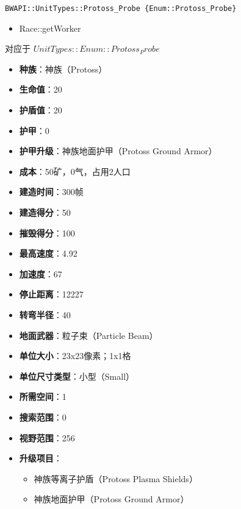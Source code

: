 \begin{tcolorbox}[colback=white, colframe=black!60!white, title=Protoss\_Probe(), arc=0mm]
    \begin{verbatim}
BWAPI::UnitTypes::Protoss_Probe {Enum::Protoss_Probe}
    \end{verbatim}
    \begin{refer}
        \begin{itemize}
            \item Race::getWorker
        \end{itemize}
    \end{refer}
    对应于  $ UnitTypes::Enum::Protoss_Probe $ 
    \begin{itemize}
        \item \textbf{种族}：神族（Protoss）
        \item \textbf{生命值}：20
        \item \textbf{护盾值}：20
        \item \textbf{护甲}：0
        \item \textbf{护甲升级}：神族地面护甲（Protoss Ground Armor）
        \item \textbf{成本}：50矿，0气，占用2人口
        \item \textbf{建造时间}：300帧
        \item \textbf{建造得分}：50
        \item \textbf{摧毁得分}：100
        \item \textbf{最高速度}：4.92
        \item \textbf{加速度}：67
        \item \textbf{停止距离}：12227
        \item \textbf{转弯半径}：40
        \item \textbf{地面武器}：粒子束（Particle Beam）
        \item \textbf{单位大小}：23x23像素；1x1格
        \item \textbf{单位尺寸类型}：小型（Small）
        \item \textbf{所需空间}：1
        \item \textbf{搜索范围}：0
        \item \textbf{视野范围}：256
        \item \textbf{升级项目}：
            \begin{itemize}
                \item 神族等离子护盾（Protoss Plasma Shields）
                \item 神族地面护甲（Protoss Ground Armor）

\end{itemize}
\end{itemize}
\end{tcolorbox}
